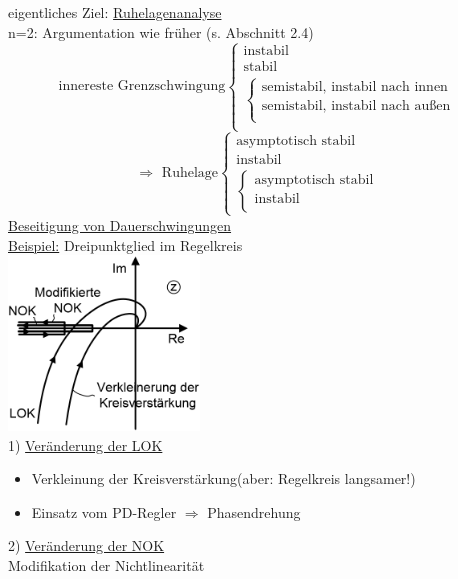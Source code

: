 \documentclass[openany,a4paper,11pt]{book}
\begin{document}
eigentliches Ziel: \uline{Ruhelagenanalyse}\\
n=2: Argumentation wie früher (s. Abschnitt 2.4)
\[\text{innereste Grenzschwingung} \left \{%
\begin{array}{lcrcl}
     \text{instabil} \\
     \text{stabil} \\
     \left \{%
     \begin{array}{lcrcl}
     \text{semistabil, instabil nach innen} \\
     \text{semistabil, instabil nach außen}\\
\end{array} \right.\\
\end{array} \right.\]
\[\Rightarrow \text{ Ruhelage} \left \{%
\begin{array}{lcrcl}
     \text{asymptotisch stabil} \\
     \text{instabil} \\
     \left \{%
     \begin{array}{lcrcl}
     \text{asymptotisch stabil} \\
     \text{instabil} \\
     \end{array} \right.
\end{array} \right.
\]
\uline{Beseitigung von Dauerschwingungen}\\
\uline{Beispiel:} Dreipunktglied im Regelkreis\\
\includegraphics[width=2in]{imgs/NLR63.png}\\
1) \uline{Veränderung der LOK}
\begin{itemize}
    \item Verkleinung der Kreisverstärkung(aber: Regelkreis langsamer!)
    \item Einsatz vom PD-Regler $\Rightarrow$ Phasendrehung
\end{itemize}
2) \uline{Veränderung der NOK}\\
Modifikation der Nichtlinearität\\\\
\end{document}
